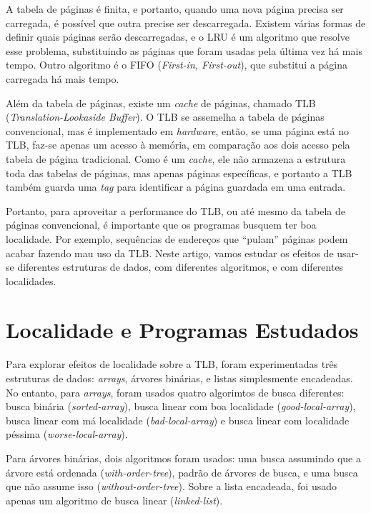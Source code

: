 \documentclass[a4paper]{article}
\begin{document}
A tabela de páginas é finita, e portanto, quando uma nova página precisa ser
carregada, é possível que outra precise ser descarregada. Existem várias formas
de definir quais páginas serão descarregadas, e o LRU é um algoritmo que resolve
esse problema, substituindo as páginas que foram usadas pela última vez há mais
tempo. Outro algoritmo é o FIFO (\textit{First-in, First-out}), que substitui a
página carregada há mais tempo.

Além da tabela de páginas, existe um \textit{cache} de páginas, chamado TLB
(\textit{Translation-Lookaside Buffer}). O TLB se assemelha a tabela de
páginas convencional, mas é implementado em \textit{hardware}, então, se uma
página está no TLB, faz-se apenas um acesso à memória, em comparação aos
dois acesso pela tabela de página tradicional. Como é um \textit{cache}, ele não
armazena a estrutura toda das tabelas de páginas, mas apenas páginas
específicas, e portanto a TLB também guarda uma \textit{tag} para identificar a
página guardada em uma entrada.

Portanto, para aproveitar a performance do TLB, ou até mesmo da tabela de
páginas convencional, é importante que os programas busquem ter boa localidade.
Por exemplo, sequências de endereços que ``pulam'' páginas podem acabar fazendo
mau uso da TLB. Neste artigo, vamos estudar os efeitos de usar-se diferentes
estruturas de dados, com diferentes algoritmos, e com diferentes localidades.

\section{Localidade e Programas Estudados}

Para explorar efeitos de localidade sobre a TLB, foram experimentadas três
estruturas de dados: \textit{arrays}, árvores binárias, e listas simplesmente
encadeadas. No entanto, para \textit{arrays}, foram usados quatro algorimtos de
busca diferentes: busca binária (\textit{sorted-array}), busca linear com boa
localidade (\textit{good-local-array}), busca linear com má localidade
(\textit{bad-local-array}) e busca linear com localidade péssima
(\textit{worse-local-array}).

Para árvores binárias, dois algoritmos foram usados: uma busca assumindo que a
árvore está ordenada (\textit{with-order-tree}), padrão de árvores de busca, e
uma busca que não assume isso (\textit{without-order-tree}). Sobre a lista
encadeada, foi usado apenas um algoritmo de busca linear (\textit{linked-list}).

\nocite{*}
\printbibliography
\end{document}
